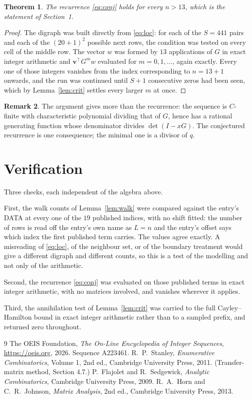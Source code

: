 \documentclass[11pt,a4paper]{article}
\theoremstyle{plain}
\newtheorem{theorem}{Theorem}
\theoremstyle{definition}
\newtheorem{remark}[theorem]{Remark}
\begin{document}
\begin{theorem}
The recurrence \eqref{eq:conj} holds for every $n>13$, which is the statement of
Section~1.
\end{theorem}

\begin{proof}
The digraph was built directly from \eqref{eq:loc}: for each of the $S=441$ pairs and each
of the $(20+1)^{2}$ possible next rows, the condition was tested on every cell of
the middle row. The vector $w$ was formed by $13$ applications of $G$ in exact integer
arithmetic and $\mathbf{v}^{\!\top}G^{m}w$ evaluated for $m=0,1,\dots$, again exactly.
Every one of those integers vanishes from the index corresponding to $n=13+1$ onwards,
and the run was continued until $S+1$ consecutive zeros had been seen, which by
Lemma~\ref{lem:crit} settles every larger $m$ at once.
\end{proof}

\begin{remark}
The argument gives more than the recurrence: the sequence is $C$-finite with characteristic
polynomial dividing that of $G$, hence has a rational generating function whose denominator
divides $\det(I-xG)$. The conjectured recurrence is one consequence; the minimal one is a
divisor of $q$.
\end{remark}

\section{Verification}

Three checks, each independent of the algebra above.

First, the walk counts of Lemma~\ref{lem:walk} were compared against the entry's DATA at
every one of the $19$ published indices, with no shift fitted: the number of rows is
read off the entry's own name as $L=n$ and the entry's offset says which index the first
published term carries. The values agree exactly. A misreading of \eqref{eq:loc}, of the
neighbour set, or of the boundary treatment would give a different digraph and different
counts, so this is a test of the modelling and not only of the arithmetic.

Second, the recurrence \eqref{eq:conj} was evaluated on those published terms in exact
integer arithmetic, with no matrices involved, and vanishes wherever it applies.

Third, the annihilation test of Lemma~\ref{lem:crit} was carried to the full
Cayley--Hamilton bound in exact integer arithmetic rather than to a sampled prefix, and
returned zero throughout.

\begin{thebibliography}{9}
 The OEIS Foundation, \emph{The On-Line Encyclopedia of Integer
Sequences}, \url{https://oeis.org}, 2026. Sequence A223461.
 R.~P.~Stanley, \emph{Enumerative Combinatorics}, Volume 1, 2nd ed.,
Cambridge University Press, 2011. (Transfer-matrix method, Section 4.7.)
 P.~Flajolet and R.~Sedgewick, \emph{Analytic Combinatorics}, Cambridge
University Press, 2009.
 R.~A.~Horn and C.~R.~Johnson, \emph{Matrix Analysis}, 2nd ed., Cambridge
University Press, 2013.
\end{thebibliography}
\end{document}
